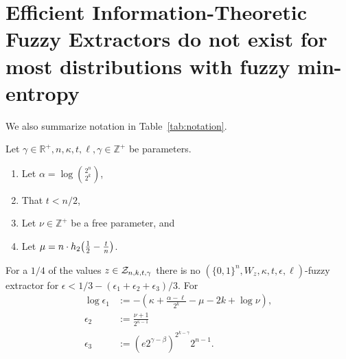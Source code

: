 

\section{Efficient Information-Theoretic Fuzzy Extractors do not exist for most distributions with fuzzy min-entropy}
\label{sec:fe}

We also summarize notation in Table~\ref{tab:notation}.

\begin{theorem}
Let $\gamma \in\mathbb{R}^+, n, \kappa, t, \ell, \gamma \in\mathbb{Z}^+$ be parameters. 
\begin{enumerate}
\itemsep0em
\item Let $\alpha = \log{{2^n\choose 2^k}}$,
\item That $t<n/2$,
\item Let $\nu \in \mathbb{Z}^+$ be a free parameter, and
\item Let $\mu =  n \cdot h_2\!\left(\frac{1}{2} - \frac{t}{n}\right)$.
\end{enumerate}
For a $1/4$ of the values $z\in\mathcal{Z}_{n,k,t,\gamma}$ there is no $(\{0,1\}^n, W_z, \kappa, t, \epsilon, \ell)$-fuzzy extractor for 
$\epsilon<1/3 - (\epsilon_1+\epsilon_2+\epsilon_3)/3.$ 
For 
\begin{align*}\log{\epsilon_1}&:= -\left(\kappa+\frac{\alpha -\ell}{2^k} - \mu -2k+\log{\nu}\right),\\
\epsilon_2&:=\frac{\nu+1}{2^{\kappa-1}}\\
\epsilon_3&:=\left(e2^{\gamma-\beta}\right)^{2^{k-\gamma}}2^{n-1}.
\end{align*}
\label{thm:main theorem}
\end{theorem}

